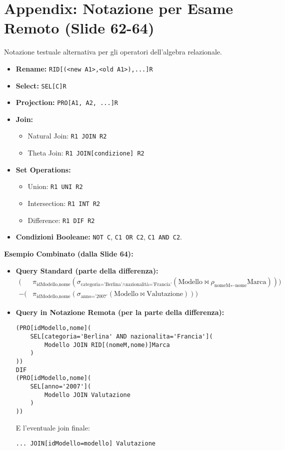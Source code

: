 \section{Appendix: Notazione per Esame Remoto (Slide 62-64)}
Notazione testuale alternativa per gli operatori dell'algebra relazionale.
\begin{itemize}
    \item \textbf{Rename:} \texttt{RID[(<new A1>,<old A1>),...]R}
    \item \textbf{Select:} \texttt{SEL[C]R}
    \item \textbf{Projection:} \texttt{PRO[A1, A2, ...]R}
    \item \textbf{Join:}
    \begin{itemize}
        \item Natural Join: \texttt{R1 JOIN R2}
        \item Theta Join: \texttt{R1 JOIN[condizione] R2}
    \end{itemize}
    \item \textbf{Set Operations:}
    \begin{itemize}
        \item Union: \texttt{R1 UNI R2}
        \item Intersection: \texttt{R1 INT R2}
        \item Difference: \texttt{R1 DIF R2}
    \end{itemize}
    \item \textbf{Condizioni Booleane:} \texttt{NOT C}, \texttt{C1 OR C2}, \texttt{C1 AND C2}.
\end{itemize}

\textbf{Esempio Combinato (dalla Slide 64):}
\begin{itemize}
    \item \textbf{Query Standard (parte della differenza):}
    \[
    \begin{split}
    ( & \pi_{\text{idModello,nome}} (\sigma_{\text{categoria='Berlina'} \wedge \text{nazionalità='Francia'}} (\text{Modello} \Join \rho_{\text{nomeM}\leftarrow\text{nome}} \text{Marca}))) \\
    - ( & \pi_{\text{idModello,nome}} (\sigma_{\text{anno='2007'}} (\text{Modello} \Join \text{Valutazione})))
    \end{split}
    \]
    \item \textbf{Query in Notazione Remota (per la parte della differenza):}
\begin{verbatim}
(PRO[idModello,nome](
    SEL[categoria='Berlina' AND nazionalita='Francia'](
        Modello JOIN RID[(nomeM,nome)]Marca
    )
))
DIF
(PRO[idModello,nome](
    SEL[anno='2007'](
        Modello JOIN Valutazione
    )
))
\end{verbatim}
    E l'eventuale join finale:
\begin{verbatim}
... JOIN[idModello=modello] Valutazione
\end{verbatim}
\end{itemize}

